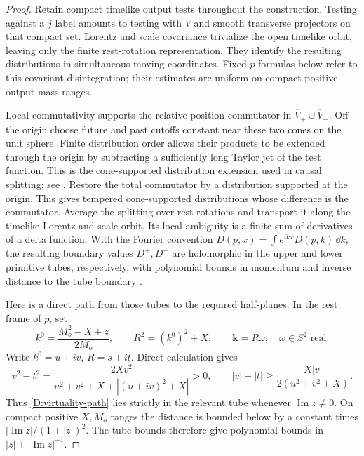 \begin{proof}
Retain compact timelike output tests throughout the construction.
Testing against a $j$ label amounts to testing with $V$ and smooth
transverse projectors on that compact set. Lorentz and scale covariance
trivialize the open timelike orbit, leaving only the finite rest-rotation
representation. They identify the resulting distributions in simultaneous
moving coordinates. Fixed-$p$ formulas below refer to this covariant
disintegration; their estimates are uniform on compact positive output
mass ranges.

Local commutativity supports the relative-position commutator in
$\overline V_+\cup\overline V_-$.  Off the origin choose future and
past cutoffs constant near these two cones on the unit sphere.  Finite
distribution order allows their products to be extended through the
origin by subtracting a sufficiently long Taylor jet of the test
function. This is the cone-supported distribution extension used in
causal splitting; see \cite[Section~5.1]{EpsteinGlaser1973}.
Restore the total commutator by a distribution supported
at the origin.  This gives tempered cone-supported distributions
whose difference is the commutator.  Average the splitting over rest
rotations and transport it along the timelike Lorentz and scale
orbit.  Its local ambiguity is a finite sum of derivatives of a
delta function.  With the Fourier convention
$D(p,x)=\int e^{ikx}D(p,k)\,\dd k$, the resulting boundary values
$D^+,D^-$ are holomorphic in the upper and lower primitive tubes,
respectively, with polynomial bounds in momentum and inverse
distance to the tube boundary
\cite[Section~1, pp.~155--156]{BrosIagolnitzer1973}.

Here is a direct path from those tubes to the required half-planes.
In the rest frame of $p$, set
\begin{equation}\label{D:virtuality-path}
 k^0=\frac{M_o^2-X+z}{2M_o},\qquad
 R^2=(k^0)^2+X,\qquad \boldsymbol k=R\omega,
 \quad\omega\in S^2\text{ real}.
\end{equation}
Write $k^0=u+iv$, $R=s+it$.  Direct calculation gives
\begin{equation}\label{D:tube-distance}
 v^2-t^2=
 \frac{2Xv^2}{u^2+v^2+X+|(u+iv)^2+X|}>0,
 \qquad
 |v|-|t|\geq\frac{X|v|}{2(u^2+v^2+X)}.
\end{equation}
Thus \eqref{D:virtuality-path} lies strictly in the relevant tube
whenever $\operatorname{Im}z\ne0$.  On compact positive $X,M_o$
ranges the distance is bounded below by a constant times
$|\operatorname{Im}z|/(1+|z|)^2$.  The tube bounds therefore give
polynomial bounds in $|z|+|\operatorname{Im}z|^{-1}$.


\end{proof}
